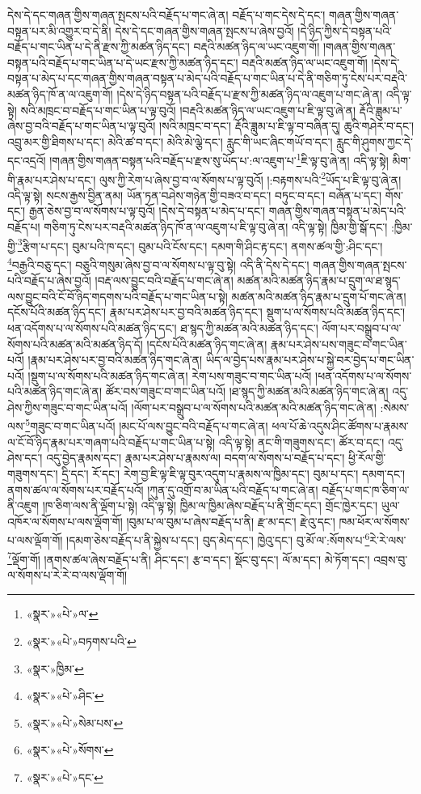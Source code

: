 དེས་དེ་དང་གཞན་གྱིས་གཞན་སྤངས་པའི་བརྗོད་པ་གང་ཞེ་ན། བརྗོད་པ་གང་དེས་དེ་དང་། གཞན་གྱིས་གཞན་བསྟན་པར་མི་འགྱུར་བ་དེ་ནི། དེས་དེ་དང་གཞན་གྱིས་གཞན་སྤངས་པ་ཞེས་བྱའོ། །དེ་ཉིད་ཀྱིས་དེ་བསྟན་པའི་བརྗོད་པ་གང་ཡིན་པ་དེ་ནི་རྫས་ཀྱི་མཚན་ཉིད་དང་། བརྡའི་མཚན་ཉིད་ལ་ཡང་འཇུག་གོ། །གཞན་གྱིས་གཞན་བསྟན་པའི་བརྗོད་པ་གང་ཡིན་པ་དེ་ཡང་རྫས་ཀྱི་མཚན་ཉིད་དང་། བརྡའི་མཚན་ཉིད་ལ་ཡང་འཇུག་གོ། །དེས་དེ་བསྟན་པ་མེད་པ་དང་གཞན་གྱིས་གཞན་བསྟན་པ་མེད་པའི་བརྗོད་པ་གང་ཡིན་པ་དེ་ནི་གཅིག་ཏུ་ངེས་པར་བརྡའི་མཚན་ཉིད་ཁོ་ན་ལ་འཇུག་གོ། །དེས་དེ་ཉིད་བསྟན་པའི་བརྗོད་པ་རྫས་ཀྱི་མཚན་ཉིད་ལ་འཇུག་པ་གང་ཞེ་ན། འདི་ལྟ་སྟེ། སའི་མཁྲང་བ་བརྗོད་པ་གང་ཡིན་པ་ལྟ་བུའོ། །བརྡའི་མཚན་ཉིད་ལ་ཡང་འཇུག་པ་ཇི་ལྟ་བུ་ཞེ་ན། རྡོའི་ཟླུམ་པ་ཞེས་བྱ་བའི་བརྗོད་པ་གང་ཡིན་པ་ལྟ་བུའོ། །སའི་མཁྲང་བ་དང་། རྡོའི་ཟླུམ་པ་ཇི་ལྟ་བ་བཞིན་དུ། ཆུའི་གཤེར་བ་དང་། འབྲུ་མར་གྱི་ཐིགས་པ་དང་། མེའི་ཚ་བ་དང་། མེའི་མེ་ལྕེ་དང་། རླུང་གི་ཡང་ཞིང་གཡོ་བ་དང་། རླུང་གི་ཤུགས་ཀྱང་དེ་དང་འདྲའོ། །གཞན་གྱིས་གཞན་བསྟན་པའི་བརྗོད་པ་རྫས་སུ་ཡོད་པ་:ལ་འཇུག་པ་\footnote{«སྣར་»«པེ་»ལ་}ཇི་ལྟ་བུ་ཞེ་ན། འདི་ལྟ་སྟེ། མིག་གི་རྣམ་པར་ཤེས་པ་དང་། ལུས་ཀྱི་རེག་པ་ཞེས་བྱ་བ་ལ་སོགས་པ་ལྟ་བུའོ། །:བརྟགས་པའི་\footnote{«སྣར་»«པེ་»བཏགས་པའི་}ཡོད་པ་ཇི་ལྟ་བུ་ཞེ་ན། འདི་ལྟ་སྟེ། སངས་རྒྱས་བྱིན་ནམ། ཡོན་ཏན་བཤེས་གཉེན་གྱི་བཟའ་བ་དང་། བཏུང་བ་དང་། བཞོན་པ་དང་། གོས་དང་། རྒྱན་ཅེས་བྱ་བ་ལ་སོགས་པ་ལྟ་བུའོ། །དེས་དེ་བསྟན་པ་མེད་པ་དང་། གཞན་གྱིས་གཞན་བསྟན་པ་མེད་པའི་བརྗོད་པ། གཅིག་ཏུ་ངེས་པར་བརྡའི་མཚན་ཉིད་ཁོ་ན་ལ་འཇུག་པ་ཇི་ལྟ་བུ་ཞེ་ན། འདི་ལྟ་སྟེ། ཁྱིམ་གྱི་སྒོ་དང་། :ཁྱིམ་གྱི་\footnote{«སྣར་»ཁྱིམ་}རྩིག་པ་དང་། བུམ་པའི་ཁ་དང་། བུམ་པའི་ངོས་དང་། དམག་གི་ཤིང་རྟ་དང་། ནགས་ཚལ་གྱི་:ཤིང་དང་། \footnote{«སྣར་»«པེ་»ཤིང་}བརྒྱའི་བཅུ་དང་། བཅུའི་གསུམ་ཞེས་བྱ་བ་ལ་སོགས་པ་ལྟ་བུ་སྟེ། འདི་ནི་དེས་དེ་དང་། གཞན་གྱིས་གཞན་སྤངས་པའི་བརྗོད་པ་ཞེས་བྱའོ། །བརྡ་ལས་བྱུང་བའི་བརྗོད་པ་གང་ཞེ་ན། མཚན་མའི་མཚན་ཉིད་རྣམ་པ་དྲུག་ལ་ཐ་སྙད་ལས་བྱུང་བའི་ངོ་བོ་ཉིད་གདགས་པའི་བརྗོད་པ་གང་ཡིན་པ་སྟེ། མཚན་མའི་མཚན་ཉིད་རྣམ་པ་དྲུག་པོ་གང་ཞེ་ན། དངོས་པོའི་མཚན་ཉིད་དང་། རྣམ་པར་ཤེས་པར་བྱ་བའི་མཚན་ཉིད་དང་། སྡུག་པ་ལ་སོགས་པའི་མཚན་ཉིད་དང་། ཕན་འདོགས་པ་ལ་སོགས་པའི་མཚན་ཉིད་དང་། ཐ་སྙད་ཀྱི་མཚན་མའི་མཚན་ཉིད་དང་། ལོག་པར་བསྒྲུབ་པ་ལ་སོགས་པའི་མཚན་མའི་མཚན་ཉིད་དོ། །དངོས་པོའི་མཚན་ཉིད་གང་ཞེ་ན། རྣམ་པར་ཤེས་པས་གཟུང་བ་གང་ཡིན་པའོ། །རྣམ་པར་ཤེས་པར་བྱ་བའི་མཚན་ཉིད་གང་ཞེ་ན། ཡིད་ལ་བྱེད་པས་རྣམ་པར་ཤེས་པ་སྐྱེ་བར་བྱེད་པ་གང་ཡིན་པའོ། །སྡུག་པ་ལ་སོགས་པའི་མཚན་ཉིད་གང་ཞེ་ན། རེག་པས་གཟུང་བ་གང་ཡིན་པའོ། །ཕན་འདོགས་པ་ལ་སོགས་པའི་མཚན་ཉིད་གང་ཞེ་ན། ཚོར་བས་གཟུང་བ་གང་ཡིན་པའོ། །ཐ་སྙད་ཀྱི་མཚན་མའི་མཚན་ཉིད་གང་ཞེ་ན། འདུ་ཤེས་ཀྱིས་གཟུང་བ་གང་ཡིན་པའོ། །ལོག་པར་བསྒྲུབ་པ་ལ་སོགས་པའི་མཚན་མའི་མཚན་ཉིད་གང་ཞེ་ན། :སེམས་ལས་\footnote{«སྣར་»«པེ་»སེམ་པས་}གཟུང་བ་གང་ཡིན་པའོ། །མང་པོ་ལས་བྱུང་བའི་བརྗོད་པ་གང་ཞེ་ན། ཕལ་པོ་ཆེ་འདུས་ཤིང་ཚོགས་པ་རྣམས་ལ་ངོ་བོ་ཉིད་རྣམ་པར་གཞག་པའི་བརྗོད་པ་གང་ཡིན་པ་སྟེ། འདི་ལྟ་སྟེ། ནང་གི་གཟུགས་དང་། ཚོར་བ་དང་། འདུ་ཤེས་དང་། འདུ་བྱེད་རྣམས་དང་། རྣམ་པར་ཤེས་པ་རྣམས་ལ། བདག་ལ་སོགས་པ་བརྗོད་པ་དང་། ཕྱི་རོལ་གྱི་གཟུགས་དང་། དྲི་དང་། རོ་དང་། རེག་བྱ་ཇི་ལྟ་ཇི་ལྟ་བུར་འདུག་པ་རྣམས་ལ་ཁྱིམ་དང་། བུམ་པ་དང་། དམག་དང་། ནགས་ཚལ་ལ་སོགས་པར་བརྗོད་པའོ། །ཀུན་དུ་འགྲོ་བ་མ་ཡིན་པའི་བརྗོད་པ་གང་ཞེ་ན། བརྗོད་པ་གང་ཁ་ཅིག་ལ་ནི་འཇུག །ཁ་ཅིག་ལས་ནི་ལྡོག་པ་སྟེ། འདི་ལྟ་སྟེ། ཁྱིམ་ལ་ཁྱིམ་ཞེས་བརྗོད་པ་ནི་གྲོང་དང་། གྲོང་ཁྱེར་དང་། ཡུལ་འཁོར་ལ་སོགས་པ་ལས་ལྡོག་གོ། །བུམ་པ་ལ་བུམ་པ་ཞེས་བརྗོད་པ་ནི། རྫ་མ་དང་། རྫེའུ་དང་། ཁམ་ཕོར་ལ་སོགས་པ་ལས་ལྡོག་གོ། །དམག་ཅེས་བརྗོད་པ་ནི་སྐྱེས་པ་དང་། བུད་མེད་དང་། ཁྱེའུ་དང་། བུ་མོ་ལ་:སོགས་པ་\footnote{«སྣར་»«པེ་»སོགས་}རེ་རེ་ལས་\footnote{«སྣར་»«པེ་»དང་}ལྡོག་གོ། །ནགས་ཚལ་ཞེས་བརྗོད་པ་ནི། ཤིང་དང་། རྩ་བ་དང་། སྡོང་བུ་དང་། ལོ་མ་དང་། མེ་ཏོག་དང་། འབྲས་བུ་ལ་སོགས་པ་རེ་རེ་བ་ལས་ལྡོག་གོ། 